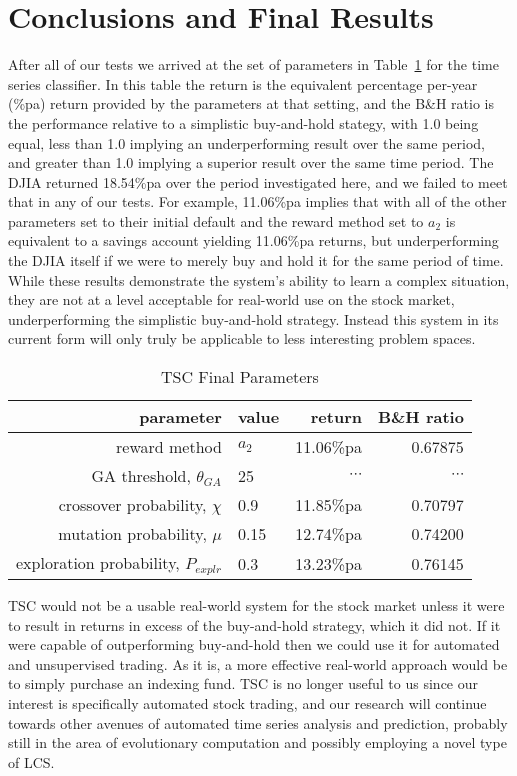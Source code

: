\section{Conclusions and Final Results}
After all of our tests we arrived at the set of parameters in Table~\ref{tab:final-parameters} for the time series classifier.
In this table the return is the equivalent percentage per-year (\%pa) return provided by the parameters at that setting, and the B\&H ratio is the performance relative to a simplistic buy-and-hold stategy, with 1.0 being equal, less than 1.0 implying an underperforming result over the same period, and greater than 1.0 implying a superior result over the same time period.
The DJIA returned 18.54\%pa over the period investigated here, and we failed to meet that in any of our tests.
For example, 11.06\%pa implies that with all of the other parameters set to their initial default and the reward method set to $a_2$ is equivalent to a savings account yielding 11.06\%pa returns, but underperforming the DJIA itself if we were to merely buy and hold it for the same period of time.
While these results demonstrate the system's ability to learn a complex situation, they are not at a level acceptable for real-world use on the stock market, underperforming the simplistic buy-and-hold strategy.
Instead this system in its current form will only truly be applicable to less interesting problem spaces.

\begin{table}
\begin{center}
\caption{TSC Final Parameters}
\begin{tabular}{|r|l|rr|}
   \hline
   \textbf{parameter} & \textbf{value} & \textbf{return} & \textbf{B\&H ratio}\\
   \hline
   reward method & $a_2$ & 11.06\%pa & 0.67875 \\
   GA threshold, $\theta_{GA}$ & 25 & $\cdots$ & $\cdots$ \\
   crossover probability, $\chi$ & 0.9 & 11.85\%pa & 0.70797 \\
   mutation probability, $\mu$ & 0.15 & 12.74\%pa & 0.74200 \\
   exploration probability, $P_{explr}$ & 0.3 & 13.23\%pa & 0.76145\\
   \hline
\end{tabular}
\label{tab:final-parameters}
\end{center}
\end{table}

TSC would not be a usable real-world system for the stock market unless it were to result in returns in excess of the buy-and-hold strategy, which it did not.
If it were capable of outperforming buy-and-hold then we could use it for automated and unsupervised trading.
As it is, a more effective real-world approach would be to simply purchase an indexing fund.
TSC is no longer useful to us since our interest is specifically automated stock trading, and our research will continue towards other avenues of automated time series analysis and prediction, probably still in the area of evolutionary computation and possibly employing a novel type of LCS.

